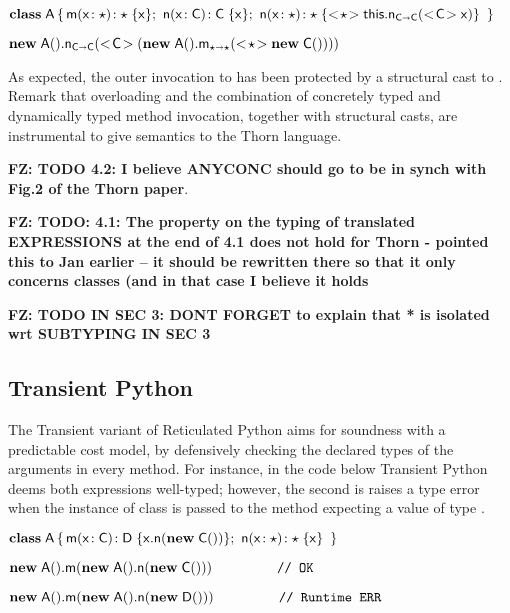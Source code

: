 \documentclass[acmlarge, anonymous, authordraft, review]{acmart} %
\newcommand{\FZ}[1]{\textbf{FZ: #1}}
\begin{document}
\medskip
\(
 \Class \A {
    \Mdef \m\x\any \any  \x  ; \ 
    \Mdef \n\x\C\C  \x ; \  \Mdef \n\x\any\any {\SubCast \any {\KCall \this \n {\SubCast \C \x}  \C \C }}   %
    }
\)
\medskip


\( \KCall {\New \A{}} \n {\SubCast \C {( \KCall {\New \A{}} \m {\SubCast \any {\New \C{}}} \any \any)}} \C \C \)

\medskip

\noindent As expected, the outer invocation to \n has been protected by a structural cast to \C.  Remark that \kafka overloading and the combination of concretely typed and dynamically typed method invocation, together with structural casts, are instrumental to give semantics to the Thorn language.


\medskip
 \FZ{TODO 4.2: I believe ANYCONC should go to be in synch with Fig.2 of the Thorn paper}.
 
\FZ{TODO: 4.1: The property on the typing of translated EXPRESSIONS at the end of 4.1 does not hold for Thorn - pointed this to Jan earlier -- it should be rewritten there so that it only concerns classes (and in that case I believe it holds }

\FZ{TODO IN SEC 3: DONT FORGET to explain that * is isolated wrt SUBTYPING IN SEC 3}

\subsection{Transient Python}

The Transient variant of Reticulated Python aims for soundness
with a predictable cost model, by defensively checking the declared types of the arguments in every method.  For instance, in the code below Transient Python deems both expressions well-typed;  however, the
second is raises a type error when the instance of class \D is passed to the method \m
expecting a value of type \C.  

\smallskip
\(\Class \A  { \Mdef \m\x\C \D  {\Call \x\n{\New{\C}{}}}  ; \  \Mdef \n\x\any \any  \x} \)

\smallskip
\(\Call {\New\A{}} \m{\Call {\New \A{}} \n {\New \C{}}} \ \ \ \ \ \ \ \ \ \ \ \ \ \ \texttt{// OK}\)

\(\Call {\New\A{}} \m{\Call {\New \A{}} \n {\New \D{}}} \ \ \ \ \ \ \ \ \ \ \ \ \ \ \texttt{// Runtime ERR}\)
\smallskip
\end{document}
